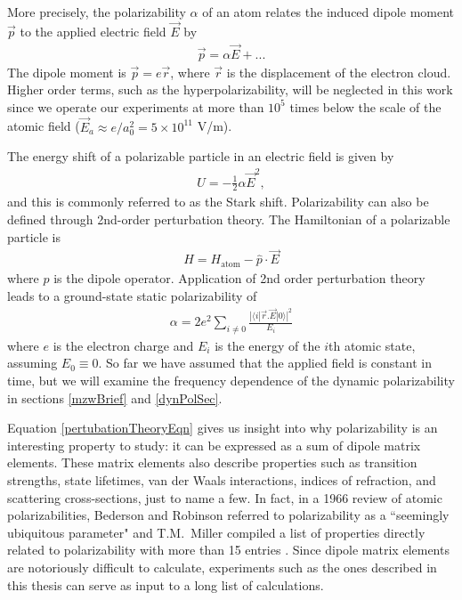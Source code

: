 More precisely, the polarizability $\alpha$ of an atom relates the induced dipole moment $\vec{p}$ to the applied electric field $\vec{E}$ by
\begin{eqnarray}
\vec{p} = \alpha \vec{E} +  ...
\end{eqnarray}
The dipole moment is $\vec{p}=e\vec{r}$, where $\vec{r}$ is the displacement of the electron cloud. Higher order terms, such as the hyperpolarizability, will be neglected in this work since we operate our experiments at more than $10^5$ times below the scale of the atomic field ($\vec{E}_a \approx e/a_0^2=5\times10^{11}$ V/m). 


The energy shift of a polarizable particle in an electric field is given by
\begin{eqnarray}
\label{starkShift}
U = -\frac{1}{2} \alpha \vec{E}^2,
\end{eqnarray}
and this is commonly referred to as the Stark shift. Polarizability can also be defined through 2nd-order perturbation theory. The Hamiltonian of a polarizable particle is
\begin{eqnarray}
H = H_\textrm{atom} - \hat{p} \cdot \vec{E}
\end{eqnarray}
where $\hat{p}$ is the dipole operator. Application of 2nd order perturbation theory leads to a ground-state static polarizability of
\begin{eqnarray}
\label{pertubationTheoryEqn}
\alpha = 2e^2 \sum_{i\neq0} \frac{ | \langle i | \vec{r} . \vec{E} | 0 \rangle |^2}{E_i}
\end{eqnarray}
where $e$ is the electron charge and $E_i$ is the energy of the $i$th atomic state, assuming $E_0 \equiv 0$. So far we have assumed that the applied field is constant in time, but we will examine the frequency dependence of the dynamic polarizability in sections \ref{mzwBrief} and \ref{dynPolSec}.


Equation \ref{pertubationTheoryEqn} gives us insight into why polarizability is an interesting property to study: it can be expressed as a sum of dipole matrix elements. These matrix elements also describe properties such as transition strengths, state lifetimes, van der Waals interactions, indices of refraction, and scattering cross-sections, just to name a few. In fact, in a 1966 review of atomic polarizabilities, Bederson and Robinson referred to polarizability as a ``seemingly ubiquitous parameter" \cite{Bed66} and T.M.~Miller compiled a list of properties directly related to polarizability with more than 15 entries \cite{Mil12}. Since dipole matrix elements are notoriously difficult to calculate, experiments such as the ones described in this thesis can serve as input to a long list of calculations.


